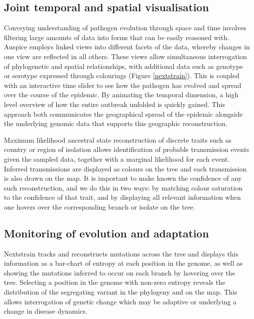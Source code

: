 \documentclass[11pt,oneside,letterpaper]{article}
\begin{document}
\subsection*{Joint temporal and spatial visualisation}
Conveying understanding of pathogen evolution through space and time involves filtering large amounts of data into forms that can be easily reasoned with.
Auspice employs linked views into different facets of the data, whereby changes in one view are reflected in all others.
These views allow simultaneous interrogation of phylogenetic and spatial relationships, with additional data such as genotype or serotype expressed through colourings (Figure \ref{nextstrain}).
This is coupled with an interactive time slider to see how the pathogen has evolved and spread over the course of the epidemic.
By animating the temporal dimension, a high level overview of how the entire outbreak unfolded is quickly gained.
This approach both communicates the geographical spread of the epidemic alongside the underlying genomic data that supports this geographic reconstruction.

Maximum likelihood ancestral state reconstruction of discrete traits such as country or region of isolation allows identification of probable transmission events given the sampled data, together with a marginal likelihood for each event.
Inferred transmissions are displayed as colours on the tree and each transmission is also drawn on the map.
It is important to make known the confidence of any such reconstruction, and we do this in two ways: by matching colour saturation to the confidence of that trait, and by displaying all relevant information when one hovers over the corresponding branch or isolate on the tree.

\subsection*{Monitoring of evolution and adaptation}
Nextstrain tracks and reconstructs mutations across the tree and displays this information as a bar-chart of entropy at each position in the genome, as well as showing the mutations inferred to occur on each branch by hovering over the tree.
Selecting a position in the genome with non-zero entropy reveals the distribution of the segregating variant in the phylogeny and on the map.
This allows interrogation of genetic change which may be adaptive or underlying a change in disease dynamics.
\end{document}

